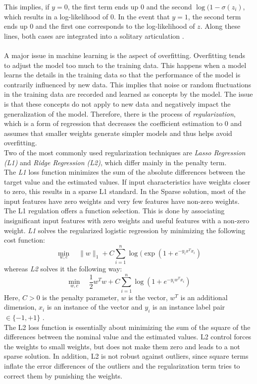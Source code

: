 \documentclass[a4paper, 11pt,titlepage,oneside,openany]{book}
\begin{document}
\noindent This implies, if $y=0$, the first term ends up $0$ and the second $\log(1-\sigma(z_i)$, which results in a log-likelihood of $0$. In the event that $y=1$, the second term ends up 0 and the first one corresponds to the log-likelihood of $z$. Along these lines, both cases are integrated into a solitary articulation \cite{algorithms}. \\
\\ A major issue in machine learning is the aspect of overfitting. Overfitting tends to adjust the model too much to the training data. This happens when a model learns the details in the training data so that the performance of the model is contrarily influenced by new data. This implies that noise or random fluctuations in the training data are recorded and learned as concepts by the model. The issue is that these concepts do not apply to new data and negatively impact the generalization of the model. Therefore, there is the process of \textit{regularization}, which is a form of regression that decreases the coefficient estimation to $0$ and assumes that smaller weights generate simpler models and thus helps avoid overfitting. \\
\noindent Two of the most commonly used regularization techniques are \textit{Lasso Regression (L1)} and \textit{Ridge Regression (L2)}, which differ mainly in the penalty term. \\
\noindent The \textit{L1} loss function minimizes the sum of the absolute differences between the target value and the estimated values. If input characteristics have weights closer to zero, this results in a sparse L1 standard. In the Sparse solution, most of the input features have zero weights and very few features have non-zero weights. The L1 regulation offers a function selection. This is done by associating insignificant input features with zero weights and useful features with a non-zero weight. 
\noindent \textit{L1} solves the regularized logistic regression by minimizing the following cost function:
\[
\min_{w, c} \quad \|w\|_1 + C \sum_{i=1}^n \log(\exp(1+e^{-y_ix^Tx_i})
\]
whereas \textit{L2} solves it the following way:
\[
\min_{w, c} \quad \frac{1}{2}w^T w + C \sum_{i=1}^n \log(1+e^{-y_iw^Tx_i})
\]
Here, $C>0$ is the penalty parameter, $w$ is the vector, $w^T$ is an additional dimension, $x_i$ is an instance of the vector and $y_i$ is an instance label pair $\in \{-1,+1\}$ \cite{liblinear}.\\
The L2 loss function is essentially about minimizing the sum of the square of the differences between the nominal value and the estimated values.
L2 control forces the weights to small weights, but does not make them zero and leads to a not sparse solution. In addition, L2 is not robust against outliers, since square terms inflate the error differences of the outliers and the regularization term tries to correct them by punishing the weights.
\end{document}
